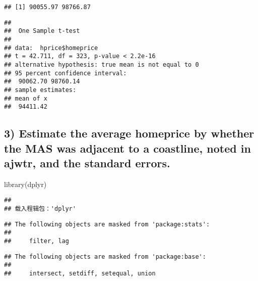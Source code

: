 \documentclass[
  12pt,
]{article}
\newenvironment{Shaded}{\begin{snugshade}}{\end{snugshade}}
\newcommand{\AttributeTok}[1]{\textcolor[rgb]{0.77,0.63,0.00}{#1}}
\newcommand{\FloatTok}[1]{\textcolor[rgb]{0.00,0.00,0.81}{#1}}
\newcommand{\FunctionTok}[1]{\textcolor[rgb]{0.00,0.00,0.00}{#1}}
\newcommand{\NormalTok}[1]{#1}
\newcommand{\SpecialCharTok}[1]{\textcolor[rgb]{0.00,0.00,0.00}{#1}}
\begin{document}
\begin{verbatim}
## [1] 90055.97 98766.87
\end{verbatim}

\begin{Shaded}
\end{Shaded}

\begin{verbatim}
## 
##  One Sample t-test
## 
## data:  hprice$homeprice
## t = 42.711, df = 323, p-value < 2.2e-16
## alternative hypothesis: true mean is not equal to 0
## 95 percent confidence interval:
##  90062.70 98760.14
## sample estimates:
## mean of x 
##  94411.42
\end{verbatim}

\hypertarget{estimate-the-average-homeprice-by-whether-the-mas-was-adjacent-to-a-coastline-noted-in-ajwtr-and-the-standard-errors.}{%
\subsection{3) Estimate the average homeprice by whether the MAS was
adjacent to a coastline, noted in ajwtr, and the standard
errors.}\label{estimate-the-average-homeprice-by-whether-the-mas-was-adjacent-to-a-coastline-noted-in-ajwtr-and-the-standard-errors.}}

\begin{Shaded}
\begin{Highlighting}[]
\FunctionTok{library}\NormalTok{(dplyr)}
\end{Highlighting}
\end{Shaded}

\begin{verbatim}
## 
## 载入程辑包：'dplyr'
\end{verbatim}

\begin{verbatim}
## The following objects are masked from 'package:stats':
## 
##     filter, lag
\end{verbatim}

\begin{verbatim}
## The following objects are masked from 'package:base':
## 
##     intersect, setdiff, setequal, union
\end{verbatim}

\begin{Shaded}
\end{Shaded}
\end{document}
